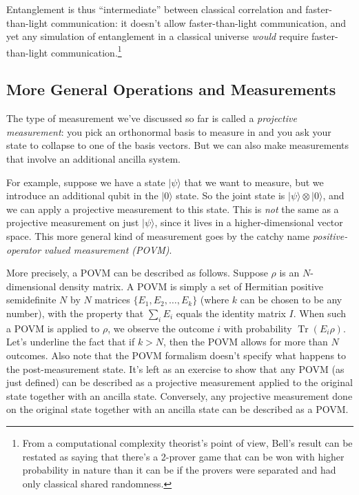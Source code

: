 \documentclass[11pt]{report}
\theoremstyle{plain}
\theoremstyle{definition}
\renewcommand{\ket}[1]{|#1\rangle}
\newcommand{\tensor}{\otimes}
\newcommand{\Tr}{\operatorname{Tr}}
\begin{document}
Entanglement is thus ``intermediate'' between classical correlation and faster-than-light communication: it doesn't allow faster-than-light communication, and yet any simulation of entanglement in a classical universe \emph{would} require faster-than-light communication.\footnote{From a computational complexity theorist's point of view, Bell's result can be restated as saying that there's a 2-prover game that can be won with higher probability in nature than it can be if the provers were separated and had only classical shared randomness.}


\subsection{More General Operations and Measurements}

The type of measurement we've discussed so far is called a \emph{projective measurement}: you pick an orthonormal basis to measure in and you ask your state to collapse to one of the basis vectors. But we can also make measurements that involve an additional ancilla system.

For example, suppose we have a state $\ket{\psi}$ that we want to measure, but we introduce an additional qubit in the $\ket{0}$ state. So the joint state is $\ket{\psi} \tensor \ket{0}$, and we can apply a projective measurement to this state. This is {\em not} the same as a projective measurement on just $\ket{\psi}$, since it lives in a higher-dimensional vector space. This more general kind of measurement goes by the catchy name {\em positive-operator valued measurement (POVM)}.

More precisely, a POVM can be described as follows. Suppose $\rho$ is an $N$-dimensional density matrix. A POVM is simply a set of Hermitian positive semidefinite $N$ by $N$ matrices $\{E_1, E_2, \ldots, E_k\}$ (where $k$ can be chosen to be any number), with the property that $\sum_i E_i$ equals the identity matrix $I$. When such a POVM is applied to $\rho$, we observe the outcome $i$ with probability $\Tr(E_i \rho)$. Let's underline the fact that if $k > N$, then the POVM allows for more than $N$ outcomes. Also note that the POVM formalism doesn't specify what happens to the post-measurement state. It's left as an exercise to show that any POVM (as just defined) can be described as a projective measurement applied to the original state together with an ancilla state. Conversely, any projective measurement done on the original state together with an ancilla state can be described as a POVM.
\end{document}

